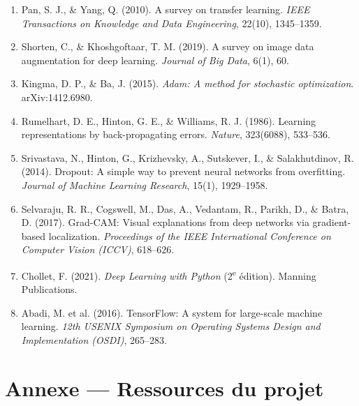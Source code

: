 \documentclass[10pt,a4paper]{article}
\begin{document}
\begin{enumerate}
\item Pan, S. J., \& Yang, Q. (2010). A survey on transfer learning. \emph{IEEE Transactions on Knowledge and Data Engineering}, 22(10), 1345--1359.
\item Shorten, C., \& Khoshgoftaar, T. M. (2019). A survey on image data augmentation for deep learning. \emph{Journal of Big Data}, 6(1), 60.
\item Kingma, D. P., \& Ba, J. (2015). \emph{Adam: A method for stochastic optimization}. arXiv:1412.6980.
\item Rumelhart, D. E., Hinton, G. E., \& Williams, R. J. (1986). Learning representations by back-propagating errors. \emph{Nature}, 323(6088), 533--536.
\item Srivastava, N., Hinton, G., Krizhevsky, A., Sutskever, I., \& Salakhutdinov, R. (2014). Dropout: A simple way to prevent neural networks from overfitting. \emph{Journal of Machine Learning Research}, 15(1), 1929--1958.
\item Selvaraju, R. R., Cogswell, M., Das, A., Vedantam, R., Parikh, D., \& Batra, D. (2017). Grad-CAM: Visual explanations from deep networks via gradient-based localization. \emph{Proceedings of the IEEE International Conference on Computer Vision (ICCV)}, 618--626.
\item Chollet, F. (2021). \emph{Deep Learning with Python} (2\textsuperscript{e} édition). Manning Publications.
\item Abadi, M. et al. (2016). TensorFlow: A system for large-scale machine learning. \emph{12th USENIX Symposium on Operating Systems Design and Implementation (OSDI)}, 265--283.
\end{enumerate}

\clearpage

\section*{Annexe --- Ressources du projet}
\end{document}
